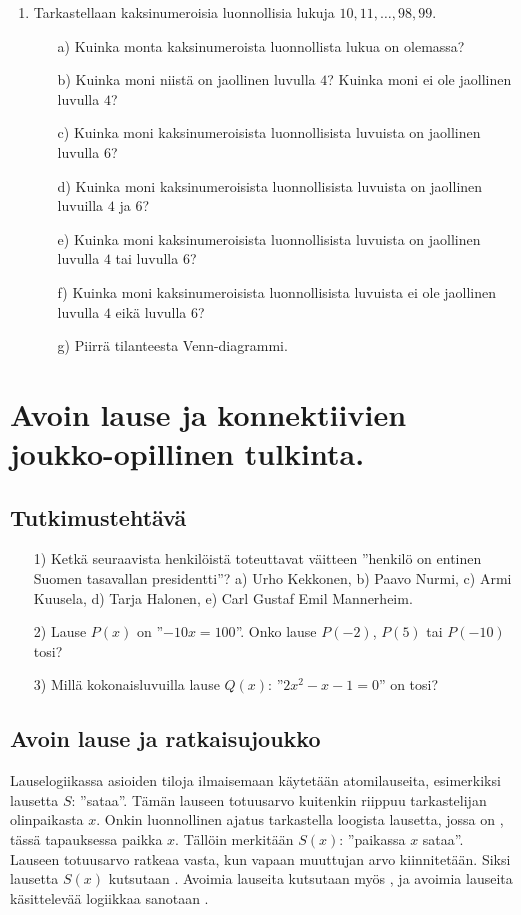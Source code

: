 \begin{enumerate}
\item Tarkastellaan kaksinumeroisia luonnollisia lukuja $10,11, \ldots ,98,99$.
\begin{itemize}
\item[a)] Kuinka monta kaksinumeroista luonnollista lukua on olemassa?
\item[b)] Kuinka moni niistä on jaollinen luvulla $4$? Kuinka moni ei ole jaollinen luvulla $4$?
\item[c)] Kuinka moni kaksinumeroisista luonnollisista luvuista on jaollinen luvulla $6$?
\item[d)] Kuinka moni kaksinumeroisista luonnollisista luvuista on jaollinen luvuilla $4$ ja $6$?
\item[e)] Kuinka moni kaksinumeroisista luonnollisista luvuista on jaollinen luvulla $4$ tai luvulla $6$?
\item[f)] Kuinka moni kaksinumeroisista luonnollisista luvuista ei ole jaollinen luvulla $4$ eikä luvulla $6$?
\item[g)] Piirrä tilanteesta Venn-diagrammi.
\end{itemize}

\end{enumerate}

\newpage


\section{Avoin lause ja konnektiivien joukko-opillinen tulkinta.}

\subsection*{Tutkimustehtävä}
\begin{itemize}
\item[1)] Ketkä seuraavista henkilöistä toteuttavat väitteen ''henkilö on entinen Suomen tasavallan presidentti''? 
a) Urho Kekkonen,  b)  Paavo Nurmi,  c)  Armi Kuusela,  d)  Tarja Halonen,  
e) Carl Gustaf Emil Mannerheim.
\item[2)] 
Lause $P(x)$ on ''$-10x = 100$''. Onko lause $P(-2)$, $P(5)$ tai $P(-10)$ tosi?
\item[3)] 
Millä kokonaisluvuilla lause $Q(x)$: ''$2x^2 - x - 1 = 0$'' on tosi?
\end{itemize}

\subsection*{Avoin lause ja ratkaisujoukko}
Lauselogiikassa asioiden tiloja ilmaisemaan käytetään atomilauseita, esimerkiksi lausetta $S$: ''sataa''. Tämän lauseen totuusarvo kuitenkin riippuu tarkastelijan olinpaikasta $x$. Onkin luonnollinen ajatus tarkastella loogista lausetta, jossa on , tässä tapauksessa paikka $x$. Tällöin merkitään $S(x)$: ''paikassa $x$ sataa''. Lauseen totuusarvo ratkeaa vasta, kun vapaan muuttujan arvo kiinnitetään. Siksi lausetta $S(x)$ kutsutaan . Avoimia lauseita kutsutaan myös , ja avoimia lauseita käsittelevää logiikkaa sanotaan .

